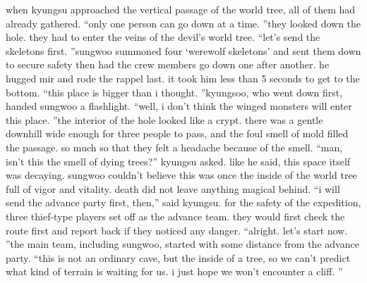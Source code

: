 when kyungsu approached the vertical passage of the world tree, all of them had already gathered.
“only one person can go down at a time.
”they looked down the hole.
 they had to enter the veins of the devil’s world tree.
“let’s send the skeletons first.
”sungwoo summoned four ‘werewolf skeletons’ and sent them down to secure safety then had the crew members go down one after another.
he hugged mir and rode the rappel last.
 it took him less than 5 seconds to get to the bottom.
“this place is bigger than i thought.
”kyungsoo, who went down first, handed sungwoo a flashlight.
 “well, i don’t think the winged monsters will enter this place.
”the interior of the hole looked like a crypt.
 there was a gentle downhill wide enough for three people to pass, and the foul smell of mold filled the passage.
 so much so that they felt a headache because of the smell.
“man, isn’t this the smell of dying trees?” kyungsu asked.
like he said, this space itself was decaying.
 sungwoo couldn’t believe this was once the inside of the world tree full of vigor and vitality.
 death did not leave anything magical behind.
“i will send the advance party first, then,” said kyungsu.
for the safety of the expedition, three thief-type players set off as the advance team.
they would first check the route first and report back if they noticed any danger.
“alright.
 let’s start now.
”the main team, including sungwoo, started with some distance from the advance party.
“this is not an ordinary cave, but the inside of a tree, so we can’t predict what kind of terrain is waiting for us.
 i just hope we won’t encounter a cliff.
”

 